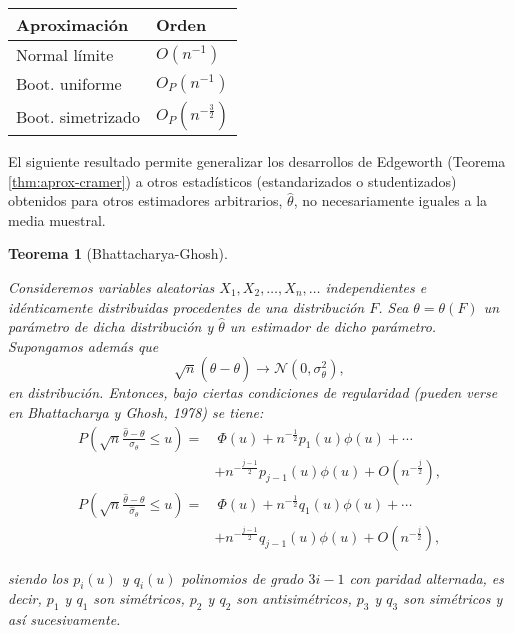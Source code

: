 \documentclass[
]{book}
\theoremstyle{break}
\newtheorem{theorem}{Teorema}[chapter]
\theoremstyle{definition}
\theoremstyle{definition}
\theoremstyle{definition}
\theoremstyle{remark}
\begin{document}
\begin{longtable}[]{@{}ll@{}}
\toprule
Aproximación & Orden\tabularnewline
\midrule
\endhead
Normal límite & \(O\left( n^{-1} \right)\)\tabularnewline
Boot. uniforme & \(O_{P}\left( n^{-1} \right)\)\tabularnewline
Boot. simetrizado & \(O_{P}\left( n^{-\frac{3}{2}} \right)\)\tabularnewline
\bottomrule
\end{longtable}

El siguiente resultado permite generalizar los desarrollos de Edgeworth
(Teorema \ref{thm:aprox-cramer})
a otros estadísticos (estandarizados o studentizados) obtenidos para
otros estimadores arbitrarios, \(\hat{\theta}\), no necesariamente iguales
a la media muestral.

\begin{theorem}[Bhattacharya-Ghosh]
\protect\hypertarget{thm:aprox-bhat-gho}{}{\label{thm:aprox-bhat-gho} \iffalse (Bhattacharya-Ghosh) \fi{} } \vspace{0.5cm}

Consideremos variables aleatorias
\(X_1,X_2,\ldots ,X_n,\ldots\) independientes e idénticamente
distribuidas procedentes de una distribución \(F\). Sea \(\theta =\theta \left( F \right)\) un parámetro de dicha distribución y \(\hat{\theta}\) un
estimador de dicho parámetro. Supongamos además
que\[\sqrt{n}\left( \hat{\theta}-\theta \right) \rightarrow \mathcal{N}\left( 0,\sigma
_{\theta }^2 \right),\]
en distribución. Entonces, bajo ciertas condiciones de regularidad
(pueden verse en Bhattacharya y Ghosh, 1978) se tiene:
\[\begin{aligned}
P\left( \sqrt{n}\frac{\hat{\theta}-\theta }{\sigma _{\theta }}\leq u \right)
= &\ \Phi \left( u \right) +n^{-\frac{1}{2}}p_1\left( u \right) \phi \left(
u \right) +\cdots \\
& +n^{-\frac{j-1}{2}}p_{j-1}\left( u \right) \phi \left( u \right) +O\left(
n^{-\frac{j}{2}} \right), \\
P\left( \sqrt{n}\frac{\hat{\theta}-\theta }{\hat{\sigma}_{\theta }}\leq
u \right) = &\ \Phi \left( u \right) +n^{-\frac{1}{2}}q_1\left( u \right) \phi
\left( u \right) +\cdots \\
& +n^{-\frac{j-1}{2}}q_{j-1}\left( u \right) \phi \left( u \right) +O\left(
n^{-\frac{j}{2}} \right),\end{aligned}\]

siendo los \(p_i\left( u \right)\) y \(q_i\left( u \right)\) polinomios
de grado \(3i-1\) con paridad alternada, es decir, \(p_1\) y \(q_1\) son
simétricos, \(p_2\) y \(q_2\) son antisimétricos, \(p_3\) y \(q_3\) son
simétricos y así sucesivamente.
\end{theorem}
\end{document}
